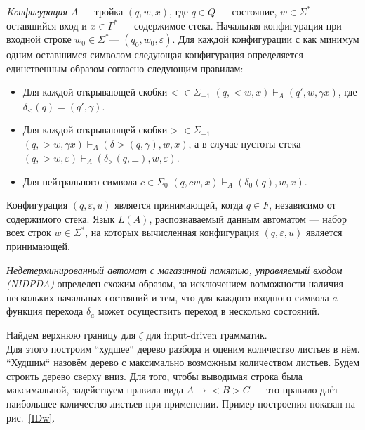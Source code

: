 \textit{Koнфигурация} $A$ --- тройка $(q, w, x)$, где $q \in Q$ --- состояние, $w \in \Sigma^*$ --- оставшийся вход и $x \in \Gamma^*$ --- содержимое стека. Начальная конфигурация при входной строке $w_0 \in \Sigma^*$--- $(q_0, w_0, \varepsilon)$. Для каждой конфигурации с как минимум одним оставшимся символом следующая конфигурация определяется единственным образом согласно следующим правилам:
\begin{itemize}
         \item Для каждой открывающей скобки < $\in \Sigma_{+1}$  $(q, <w, x) \vdash_A (q', w,  \gamma x)$, где $\delta_<(q) = (q', \gamma)$.
         \item Для каждой открывающей скобки > $\in \Sigma_{-1}$  $(q, >w,\gamma x) \vdash_A (\delta >(q, \gamma),  w, x)$, а в случае пустоты стека $(q, >w, \varepsilon) \vdash_A (\delta_>(q, \bot),  w, \varepsilon)$.
	\item Для нейтрального символа $c \in \Sigma_0$ $(q, cw, x) \vdash_A (\delta_0(q),  w, x)$.
\end{itemize}
Конфигурация $(q, \varepsilon, u)$ является принимающей, когда $q \in F$, независимо от содержимого стека. Язык $L(A)$, распознаваемый данным автоматом --- набор всех строк $w \in \Sigma^*$, на которых вычисленная конфигурация  $(q, \varepsilon, u)$ является принимающей. \par
\textit{Недетерминированный автомат с магазинной памятью, управляемый входом (NIDPDA)} определен схожим образом, за исключением возможности наличия нескольких начальных состояний и тем, что для каждого входного символа $a$ функция перехода $\delta_a$ может осуществить переход в несколько состояний. \par
Найдем верхнюю границу для $\zeta$ для input-driven грамматик.
\\Для этого построим ``худшее`` дерево разбора и оценим количество листьев в нём. ``Худшим`` назовём дерево с максимально возможным количеством листьев. Будем строить дерево сверху вниз. Для того, чтобы выводимая строка была максимальной, задействуем правила вида $A \rightarrow <B>C$ --- это правило даёт наибольшее количество листьев при применении. Пример построения показан на рис.~\ref{IDw}.
\\
